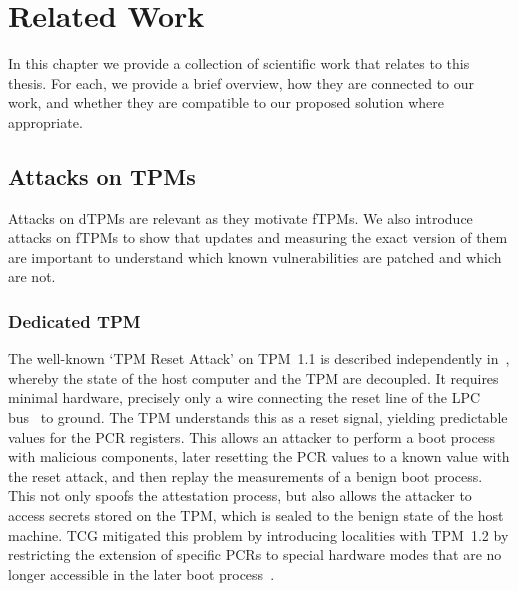 
\chapter{Related Work}\label{chapter:related_work}

In this chapter we provide a collection of scientific work that relates to this thesis.
For each, we provide a brief overview, how they are connected to our work, and whether they are compatible to our proposed solution where appropriate.

\section{Attacks on TPMs}

Attacks on \acp{dTPM} are relevant as they motivate \acp{fTPM}.
We also introduce attacks on \acp{fTPM} to show that updates and measuring the exact version of them are important to understand which known vulnerabilities are patched and which are not.

\subsection{Dedicated TPM}

The well-known `TPM Reset Attack' on TPM~1.1 is described independently in~\cite{kauerBernhard,sparks2007}, whereby the state of the host computer and the TPM are decoupled.
It requires minimal hardware, precisely only a wire connecting the reset line of the LPC bus~\cite{lpc} to ground.
The TPM understands this as a reset signal, yielding predictable values for the \ac{PCR} registers.
This allows an attacker to perform a boot process with malicious components, later resetting the \ac{PCR} values to a known value with the reset attack, and then replay the measurements of a benign boot process.
This not only spoofs the attestation process, but also allows the attacker to access secrets stored on the TPM, which is sealed to the benign state of the host machine.
\Ac{TCG} mitigated this problem by introducing localities with TPM~1.2 by restricting the extension of specific \acp{PCR} to special hardware modes that are no longer accessible in the later boot process~\cite{tpmResetMitigation}.

